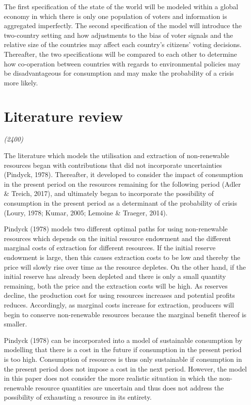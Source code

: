 \documentclass[11pt,preprint, authoryear]{elsarticle}
\numberwithin{equation}{section}
\numberwithin{figure}{section}
\numberwithin{table}{section}
\begin{document}
The first specification of the state of the world will be modeled within
a global economy in which there is only one population of voters and
information is aggregated imperfectly. The second specification of the
model will introduce the two-country setting and how adjustments to the
bias of voter signals and the relative size of the countries may affect
each country's citizens' voting decisions. Thereafter, the two
specifications will be compared to each other to determine how
co-operation between countries with regards to environmental policies
may be disadvantageous for consumption and may make the probability of a
crisis more likely.

\hypertarget{literature-review}{%
\section{Literature review}\label{literature-review}}

\emph{(2400)}

The literature which models the utilisation and extraction of
non-renewable resources began with contributions that did not
incorporate uncertainties (Pindyck, 1978). Thereafter, it developed to
consider the impact of consumption in the present period on the
resources remaining for the following period (Adler \& Treich, 2017),
and ultimately began to incorporate the possibility of consumption in
the present period as a determinant of the probability of crisis (Loury,
1978; Kumar, 2005; Lemoine \& Traeger, 2014).

Pindyck (1978) models two different optimal paths for using
non-renewable resources which depends on the initial resource endowment
and the different marginal costs of extraction for different resources.
If the initial reserve endowment is large, then this causes extraction
costs to be low and thereby the price will slowly rise over time as the
resource depletes. On the other hand, if the initial reserve has already
been depleted and there is only a small quantity remaining, both the
price and the extraction costs will be high. As reserves decline, the
production cost for using resources increases and potential profits
reduces. Accordingly, as marginal costs increase for extraction,
producers will begin to conserve non-renewable resources because the
marginal benefit thereof is smaller.

Pindyck (1978) can be incorporated into a model of sustainable
consumption by modelling that there is a cost in the future if
consumption in the present period is too high. Consumption of resources
is thus only sustainable if consumption in the present period does not
impose a cost in the next period. However, the model in this paper does
not consider the more realistic situation in which the non-renewable
resource quantities are uncertain and thus does not address the
possibility of exhausting a resource in its entirety.
\end{document}
